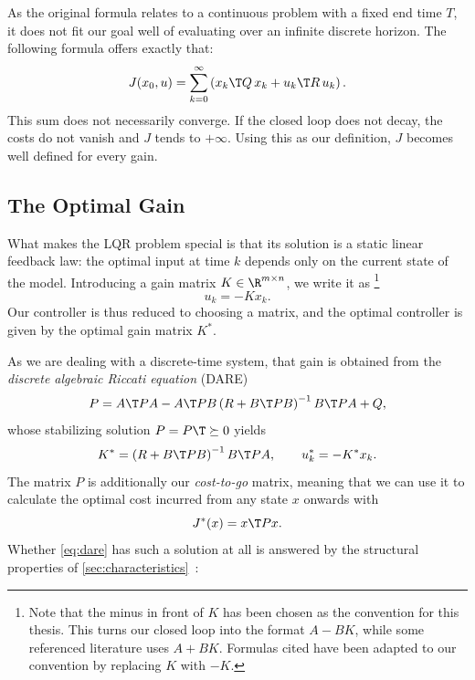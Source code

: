 As the original formula relates to a continuous problem with a fixed end time $T$,
it does not fit our goal well of evaluating over an infinite discrete horizon.
The following formula offers exactly that:
\begin{equation}
    \label{eq:lqr-cost-infinite}
    J(x_0, u) = \sum_{k=0}^{\infty} \left( x_k\T Q\, x_k + u_k\T R\, u_k \right) .
\end{equation}
This sum does not necessarily converge. If the closed loop
does not decay, the costs do not vanish and $J$ tends to $+\infty$. 
Using this as our definition, $J$ becomes well defined for every gain.

\subsection{The Optimal Gain}
\label{subsec:lqr-optimal}

What makes the LQR problem special is that its solution is a static linear feedback
law: the optimal input at time $k$ depends only on the current state of the model.
Introducing a gain matrix $K \in \R^{m \times n}$, we write it as
\footnote{Note that the minus in front of $K$ has been chosen as the convention for this thesis.
This turns our closed loop into the format $A - BK$, while some referenced literature
uses $A + BK$. Formulas cited have been adapted to our convention by replacing $K$ with $-K$.
}
\begin{equation}
    \label{eq:feedback-law}
    u_k = -K x_k .
\end{equation}
Our controller is thus reduced to choosing a matrix, and the
optimal controller is given by the optimal gain matrix $K^{*}$.

As we are dealing with a discrete-time system, that gain is obtained from the
\emph{discrete algebraic Riccati equation} (DARE)
\begin{equation}
    \label{eq:dare}
    P = A\T P A - A\T P B \left( R + B\T P B \right)^{-1} B\T P A + Q ,
\end{equation}
whose stabilizing solution $P = P\T \succeq 0$ yields
\begin{equation}
    \label{eq:optimal-gain}
    K^{*} = \left( R + B\T P B \right)^{-1} B\T P A ,
    \qquad
    u_k^{*} = -K^{*} x_k .
\end{equation}
The matrix $P$ is additionally our
\emph{cost-to-go} matrix, meaning that we can use it to calculate the optimal cost 
incurred from any state $x$ onwards with
\begin{equation}
    \label{eq:cost-to-go}
    J^{*}(x) = x\T P x .
\end{equation}
Whether \eqref{eq:dare} has such a solution at all is answered by the structural
properties of \cref{sec:characteristics}~:

